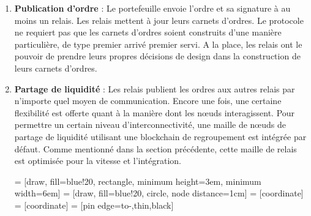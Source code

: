 \documentclass[UTF8,nofonts]{article}
\makeatletter
\newenvironment{figurehere}
 {\def\@captype{figure}}
 {}
\makeatother
\begin{document}
\begin{multicols}{2}
\begin{enumerate}
\item \textbf{Publication d'ordre} : Le portefeuille envoie l'ordre et sa signature à au moins un relais. Les relais mettent à jour leurs carnets d'ordres. Le protocole ne requiert pas que les carnets d'ordres soient construits d'une manière particulière, de type premier arrivé premier servi. A la place, les relais ont le pouvoir de prendre leurs propres décisions de design dans la construction de leurs carnets d'ordres.

\item \textbf{Partage de liquidité} : Les relais publient les ordres aux autres relais par n'importe quel moyen de communication. Encore une fois, une certaine flexibilité est offerte quant à la manière dont les nœuds interagissent. Pour permettre un certain niveau d'interconnectivité, une maille de nœuds de partage de liquidité utilisant une blockchain de regroupement est intégrée par défaut. Comme mentionné dans la section précédente, cette maille de relais est optimisée pour la vitesse et l'intégration.

\begin{center}
\begin{figurehere}
\centering
{} = [draw, fill=blue!20, rectangle, 
    minimum height=3em, minimum width=6em]
 = [draw, fill=blue!20, circle, node distance=1cm]
 = [coordinate]
 = [coordinate]
 = [pin edge={to-,thin,black}]

\end{figurehere}
\end{center}
\end{enumerate}
\end{multicols}
\end{document}
